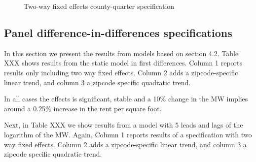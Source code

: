 \begin{figure}[h!]
    \centering
    \caption{Two-way fixed effects county-quarter specification}
    \label{fig:event_level_county2way}
\end{figure}

\subsection{Panel difference-in-differences specifications}\label{subsec:results/first-differences}

In this section we present the results from models based on section 4.2. Table XXX shows results from the static model in first differences. Column 1 reports results only including two way fixed effects. Column 2 adds a zipcode-specific linear trend, and column 3 a zipcode specific quadratic trend. 


In all cases the effects is significant, stable and a 10\% change in the MW implies around a 0.25\% increase in the rent per square foot. 

Next, in Table XXX we show results from a model with 5 leads and lags of the logarithm of the MW. Again, Column 1 reports results of a specification with two way fixed effects. Column 2 adds a zipcode-specific linear trend, and column 3 a zipcode specific quadratic trend. 

